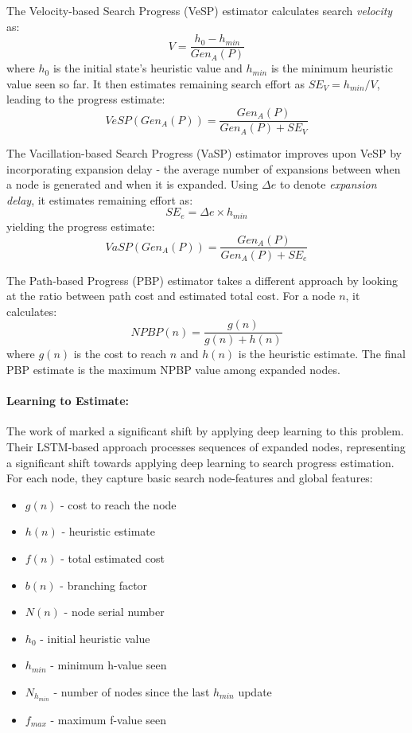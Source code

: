 \documentclass[letterpaper]{article}
\begin{document}
The Velocity-based Search Progress (VeSP) estimator calculates search \emph{velocity} as:
\begin{equation*}
    V = \frac{h_0 - h_{min}}{Gen_A(P)}
\end{equation*}
where $h_0$ is the initial state's heuristic value and $h_{min}$ is the minimum heuristic value seen so far. It then estimates remaining search effort as $SE_V = h_{min}/V$, leading to the progress estimate:
\begin{equation}
    VeSP(Gen_A(P)) = \frac{Gen_A(P)}{Gen_A(P) + SE_V}
\end{equation}

The Vacillation-based Search Progress (VaSP) estimator improves upon VeSP by incorporating expansion delay - the average number of expansions between when a node is generated and when it is expanded. Using $\Delta e$ to denote \emph{expansion delay}, it estimates remaining effort as:
\begin{equation*}
    SE_e = \Delta e \times h_{min}
\end{equation*}
yielding the progress estimate:
\begin{equation}
    VaSP(Gen_A(P)) = \frac{Gen_A(P)}{Gen_A(P) + SE_e}
\end{equation}

The Path-based Progress (PBP) estimator takes a different approach by looking at the ratio between path cost and estimated total cost. For a node $n$, it calculates:
\begin{equation}
    NPBP(n) = \frac{g(n)}{g(n) + h(n)}
\end{equation}
where $g(n)$ is the cost to reach $n$ and $h(n)$ is the heuristic estimate. The final PBP estimate is the maximum NPBP value among expanded nodes.

\paragraph{Learning to Estimate:}\label{para:learning-to-estimate}
The work of \citet{sudry2022learning} marked a significant shift by applying deep learning to this problem. Their LSTM-based approach processes sequences of expanded nodes, representing a significant shift towards applying deep learning to search progress estimation. For each node, they capture basic search node-features and global features:

\begin{itemize} 
    \item $g(n)$ - cost to reach the node
    \item $h(n)$ - heuristic estimate
    \item $f(n)$ - total estimated cost
    \item $b(n)$ - branching factor
    \item $N(n)$ - node serial number
    \item $h_0$ - initial heuristic value
    \item $h_{min}$ - minimum h-value seen
    \item $N_{h_{min}}$ - number of nodes since the last $h_{min}$ update
    \item $f_{max}$ - maximum f-value seen
\end{itemize}
\end{document}

